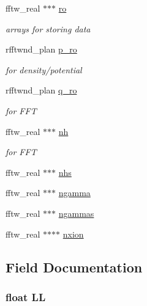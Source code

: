 \begin{DoxyCompactItemize}
fftw\+\_\+real $\ast$$\ast$$\ast$ \hyperlink{struct_g_l_o_b_a_l_v_a_r_s_aa5ca7db84db8b78f4623cde39545fa1f}{ro}
\begin{DoxyCompactList}\small\item\em arrays for storing data \end{DoxyCompactList}\item 
rfftwnd\+\_\+plan \hyperlink{struct_g_l_o_b_a_l_v_a_r_s_a8e52ad9c7463e1b0688d4f0ce102c309}{p\+\_\+ro}
\begin{DoxyCompactList}\small\item\em for density/potential \end{DoxyCompactList}\item 
rfftwnd\+\_\+plan \hyperlink{struct_g_l_o_b_a_l_v_a_r_s_ad8c20a2f4901d7fc9b4247d0b202aab6}{q\+\_\+ro}
\begin{DoxyCompactList}\small\item\em for F\+F\+T \end{DoxyCompactList}\item 
fftw\+\_\+real $\ast$$\ast$$\ast$ \hyperlink{struct_g_l_o_b_a_l_v_a_r_s_aaf5f5d543991740821b0508a5ec2e798}{nh}
\begin{DoxyCompactList}\small\item\em for F\+F\+T \end{DoxyCompactList}\item 
fftw\+\_\+real $\ast$$\ast$$\ast$ \hyperlink{struct_g_l_o_b_a_l_v_a_r_s_a75b9cc475a9b492f88ac81b10c17d615}{nhs}
\item 
fftw\+\_\+real $\ast$$\ast$$\ast$ \hyperlink{struct_g_l_o_b_a_l_v_a_r_s_ae7b5316d4357f08ef5f55d0a7731af7e}{ngamma}
\item 
fftw\+\_\+real $\ast$$\ast$$\ast$ \hyperlink{struct_g_l_o_b_a_l_v_a_r_s_a4d0f7c8f1d42a2a1e6a3739de78464e5}{ngammas}
\item 
fftw\+\_\+real $\ast$$\ast$$\ast$$\ast$ \hyperlink{struct_g_l_o_b_a_l_v_a_r_s_afe3435714e08d26c42c93e355d4d96f7}{nxion}
\end{DoxyCompactItemize}


\subsection{Field Documentation}
\hypertarget{struct_g_l_o_b_a_l_v_a_r_s_a1f72032bbac96d14f6311c15bbcc9788}{
\subsubsection[{L\+L}]{\setlength{\rightskip}{0pt plus 5cm}float L\+L}}\label{struct_g_l_o_b_a_l_v_a_r_s_a1f72032bbac96d14f6311c15bbcc9788}


